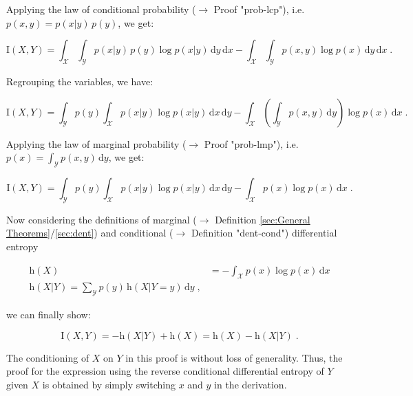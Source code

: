 \documentclass[a4paper,12pt]{book}
\begin{document}
Applying the law of conditional probability ($\rightarrow$ Proof "prob-lcp"), i.e. $p(x,y) = p(x \vert y) \, p(y)$, we get:

\begin{equation} \label{eq:cmi-mcde-MI-s2}
\mathrm{I}(X,Y) = \int_{\mathcal{X}} \int_{\mathcal{Y}} p(x|y) \, p(y) \log p(x|y) \, \mathrm{d}y \, \mathrm{d}x - \int_{\mathcal{X}} \int_{\mathcal{Y}} p(x,y) \log p(x) \, \mathrm{d}y \, \mathrm{d}x \; .
\end{equation}

Regrouping the variables, we have:

\begin{equation} \label{eq:cmi-mcde-MI-s3}
\mathrm{I}(X,Y) = \int_{\mathcal{Y}} p(y) \int_{\mathcal{X}} p(x|y) \log p(x|y) \, \mathrm{d}x \, \mathrm{d}y - \int_{\mathcal{X}} \left( \int_{\mathcal{Y}} p(x,y) \, \mathrm{d}y \right) \log p(x)\, \mathrm{d}x \; .
\end{equation}

Applying the law of marginal probability ($\rightarrow$ Proof "prob-lmp"), i.e. $p(x) = \int_{\mathcal{Y}} p(x,y) \, \mathrm{d}y$, we get:

\begin{equation} \label{eq:cmi-mcde-MI-s4}
\mathrm{I}(X,Y) = \int_{\mathcal{Y}} p(y) \int_{\mathcal{X}} p(x|y) \log p(x|y) \, \mathrm{d}x \, \mathrm{d}y - \int_{\mathcal{X}} p(x) \log p(x) \, \mathrm{d}x \; .
\end{equation}

Now considering the definitions of marginal ($\rightarrow$ Definition \ref{sec:General Theorems}/\ref{sec:dent}) and conditional ($\rightarrow$ Definition "dent-cond") differential entropy

\begin{equation} \label{eq:cmi-mcde-MDE-CDE}
\begin{split}
\mathrm{h}(X) &= - \int_{\mathcal{X}} p(x) \log p(x) \, \mathrm{d}x \\
\mathrm{h}(X|Y) = \sum_{\mathcal{Y}} p(y) \, \mathrm{h}(X|Y=y) \, \mathrm{d}y \; ,
\end{split}
\end{equation}

we can finally show:

\begin{equation} \label{eq:cmi-mcde-MI-qed}
\mathrm{I}(X,Y) = - \mathrm{h}(X|Y) + \mathrm{h}(X) = \mathrm{h}(X) - \mathrm{h}(X|Y) \; .
\end{equation}

The conditioning of $X$ on $Y$ in this proof is without loss of generality. Thus, the proof for the expression using the reverse conditional differential entropy of $Y$ given $X$ is obtained by simply switching $x$ and $y$ in the derivation.
\end{document}
